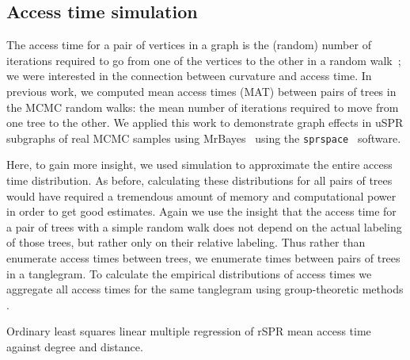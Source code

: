 \documentclass[11pt,onecolumn,conference]{IEEEtran}
\let\MYoriglatexcaption\caption
\renewcommand{\caption}[2][\relax]{\MYoriglatexcaption[#2]{#2}}
\newcommand{\cuttable}[2][]{%
    \ifthenelse{\equal{#1}{}}%
		{}%
		{#1}%
}
\begin{document}
\subsection{Access time simulation}
The access time for a pair of vertices in a graph is the (random) number of iterations required to go from one of the vertices to the other in a random walk~\cite{lovasz1993random}; we were interested in the connection between curvature and access time.
In previous work, we computed mean access times (MAT) between pairs of trees in the MCMC random walks: the mean number of iterations required to move from one tree to the other.
We applied this work to demonstrate graph effects in uSPR subgraphs of real MCMC samples using MrBayes~\cite{Whidden2015-yi} using the \texttt{sprspace}~\cite{sprspace} software.

Here, to gain more insight, we used simulation to approximate the entire access time distribution.
As before, calculating these distributions for all pairs of trees would have required a tremendous amount of memory and computational power in order to get good estimates.
Again we use the insight that the access time for a pair of trees with a simple random walk does not depend on the actual labeling of those trees, but rather only on their relative labeling.
Thus rather than enumerate access times between trees, we enumerate times between pairs of trees in a tanglegram.
To calculate the empirical distributions of access times we aggregate all access times for the same tanglegram using \cuttable{our }group-theoretic methods \cite{tangle}.

\begin{table}
\centering
\caption{Ordinary least squares linear multiple regression of rSPR mean access time against degree and distance.}
\label{tab:regressionMAT}
\end{table}
\end{document}
